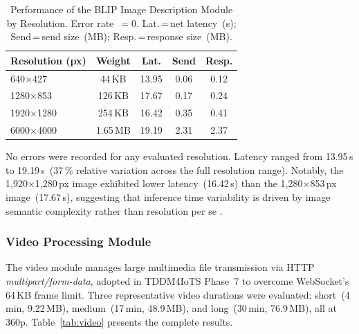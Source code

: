 \documentclass[journal]{IEEEtran}
\begin{document}
	\begin{table}[!t]
		\caption{Performance of the BLIP Image Description Module by Resolution.
			Error rate~$=0$. Lat.\,=\,net latency~(s); Send\,=\,send size~(MB);
			Resp.\,=\,response size~(MB).}
		\label{tab:img}
		\centering
		\scriptsize
		\renewcommand{\arraystretch}{1.25}
		\begin{tabular}{p{1.9cm}cccc}
			\toprule
			\textbf{Resolution (px)} & \textbf{Weight} & \textbf{Lat.} & \textbf{Send} & \textbf{Resp.} \\
			\midrule
			640$\times$427   & 44\,KB   & 13.95 & 0.06 & 0.12 \\
			1280$\times$853  & 126\,KB  & 17.67 & 0.17 & 0.24 \\
			1920$\times$1280 & 254\,KB  & 16.42 & 0.35 & 0.41 \\
			6000$\times$4000 & 1.65\,MB & 19.19 & 2.31 & 2.37 \\
			\bottomrule
		\end{tabular}
	\end{table}
	
	No errors were recorded for any evaluated resolution.
	Latency ranged from 13.95\,s to 19.19\,s~(37\,\% relative
	variation across the full resolution range).
	Notably, the 1{,}920$\times$1{,}280\,px image exhibited lower
	latency~(16.42\,s) than the 1{,}280$\times$853\,px
	image~(17.67\,s), suggesting that inference time variability
	is driven by image semantic complexity rather than resolution
	per se \cite{dognin2021,safiya2024}.
	
	\subsubsection{Video Processing Module}
	The video module manages large multimedia file transmission
	via HTTP \textit{multipart/form-data}, adopted in TDDM4IoTS
	Phase~7 to overcome WebSocket's 64\,KB frame limit.
	Three representative video durations were evaluated: short~(4\,min,
	9.22\,MB), medium~(17\,min, 48.9\,MB), and long~(30\,min,
	76.9\,MB), all at 360p.
	Table~\ref{tab:video} presents the complete results.
	
\end{document}
